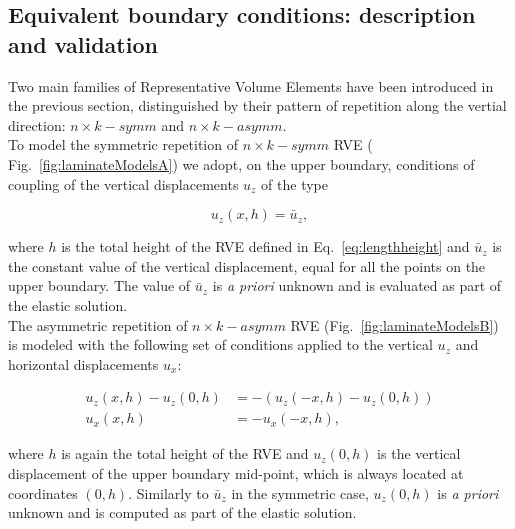 \documentclass[smallextended]{svjour3}       %
\begin{document}
\subsection{Equivalent boundary conditions: description and validation}\label{subsec:bc}

Two main families of Representative Volume Elements have been introduced in the previous section, distinguished by their pattern of repetition along the vertial direction: $n\times k-symm$ and $n\times k-asymm$.\\
To model the symmetric repetition of $n\times k-symm$ RVE ( Fig.~\ref{fig:laminateModelsA}) we adopt, on the upper boundary, conditions of coupling of the vertical displacements $u_{z}$ of the type

\begin{equation}\label{eq:symmcoupling}
u_{z}\left(x,h\right) = \bar{u}_{z},
\end{equation}

where $h$ is the total height of the RVE defined in Eq.~\ref{eq:lengthheight} and $\bar{u}_{z}$ is the constant value of the vertical displacement, equal for all the points on the upper boundary. The value of $\bar{u}_{z}$ is \emph{a priori} unknown and is evaluated as part of the elastic solution.\\
The asymmetric repetition of $n\times k-asymm$ RVE (Fig.~\ref{fig:laminateModelsB}) is modeled with the following set of conditions applied to the vertical $u_{z}$ and horizontal displacements $u_{x}$:

\begin{equation}\label{eq:asymmcoupling}
\begin{aligned}
u_{z}\left(x,h\right) - u_{z}\left(0,h\right) &= -\left(u_{z}\left(-x,h\right) - u_{z}\left(0,h\right)\right)\\
u_{x}\left(x,h\right) &= -u_{x}\left(-x,h\right),
\end{aligned}
\end{equation}

where $h$ is again the total height of the RVE and $u_{z}\left(0,h\right)$ is the vertical displacement of the upper boundary mid-point, which is always located at coordinates $(0,h)$. Similarly to $\bar{u}_{z}$ in the symmetric case, $u_{z}\left(0,h\right)$ is \emph{a priori} unknown and is computed as part of the elastic solution.
\end{document}
